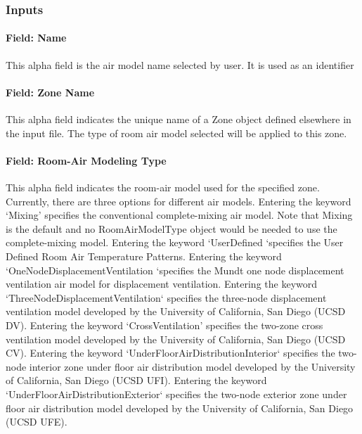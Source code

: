 \subsubsection{Inputs}\label{inputs-041}

\paragraph{Field: Name}\label{field-name-040}

This alpha field is the air model name selected by user. It is used as an identifier

\paragraph{Field: Zone Name}\label{field-zone-name-011}

This alpha field indicates the unique name of a Zone object defined elsewhere in the input file. The type of room air model selected will be applied to this zone.

\paragraph{Field: Room-Air Modeling Type}\label{field-room-air-modeling-type}

This alpha field indicates the room-air model used for the specified zone. Currently, there are three options for different air models. Entering the keyword `Mixing' specifies the conventional complete-mixing air model. Note that Mixing is the default and no Room\-Air\-Model\-Type object would be needed to use the complete-mixing model. Entering the keyword `UserDefined `specifies the User Defined Room Air Temperature Patterns. Entering the keyword `OneNodeDisplacementVentilation `specifies the Mundt one node displacement ventilation air model for displacement ventilation. Entering the keyword `ThreeNodeDisplacementVentilation` specifies the three-node displacement ventilation model developed by the University of California, San Diego (UCSD DV). Entering the keyword `CrossVentilation' specifies the two-zone cross ventilation model developed by the University of California, San Diego (UCSD CV). Entering the keyword `UnderFloorAirDistributionInterior` specifies the two-node interior zone under floor air distribution model developed by the University of California, San Diego (UCSD UFI). Entering the keyword `UnderFloorAirDistributionExterior` specifies the two-node exterior zone under floor air distribution model developed by the University of California, San Diego (UCSD UFE).

